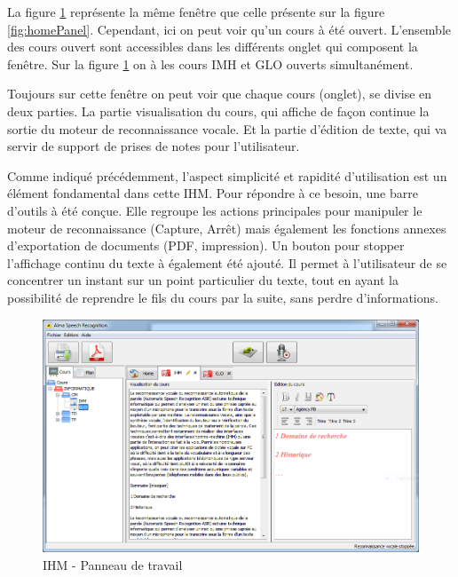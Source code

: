 La figure \ref{fig:workPanel} représente la même fenêtre que celle présente sur la figure \ref{fig:homePanel}. Cependant, ici on peut voir qu'un cours à été ouvert. L'ensemble des cours ouvert sont accessibles dans les différents onglet qui composent la fenêtre. Sur la figure \ref{fig:workPanel} on à les cours IMH et GLO ouverts simultanément.

Toujours sur cette fenêtre on peut voir que chaque cours (onglet), se divise en deux parties. La partie visualisation du cours, qui affiche de façon continue la sortie du moteur de reconnaissance vocale. Et la partie d'édition de texte, qui va servir de support de prises de notes pour l'utilisateur. 

Comme indiqué précédemment, l'aspect simplicité et rapidité d'utilisation est un élément fondamental dans cette IHM. Pour répondre à ce besoin, une barre d'outils à été conçue. Elle regroupe les actions principales pour manipuler le moteur de reconnaissance (Capture, Arrêt) mais également les fonctions annexes d'exportation de documents (PDF, impression). Un bouton pour stopper l'affichage continu du texte à également été ajouté. Il permet à l'utilisateur de se concentrer un instant sur un point particulier du texte, tout en ayant la possibilité de reprendre le fils du cours par la suite, sans perdre d'informations.



\begin{figure}[H]
 \centering
 \includegraphics[scale=0.6]{./images/workPanel.png}
 \caption{IHM - Panneau de travail}
 \label{fig:workPanel}
\end{figure}




